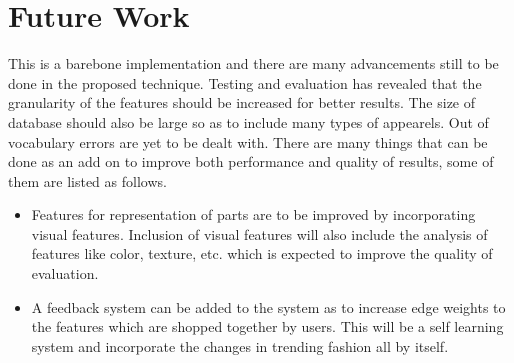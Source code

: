 \chapter{Future Work}

This is a barebone implementation and there are many advancements still to be done in the proposed technique. Testing and evaluation has revealed that the granularity of the features should be increased for better results. The size of database should also be large so as to include many types of appearels. Out of vocabulary errors are yet to be dealt with. There are many things that can be done as an add on to improve both performance and quality of results, some of them are listed as follows.

\begin{itemize}

\item Features for representation of parts are to be improved by incorporating visual features. Inclusion of visual features will also include the analysis of features like color, texture, etc. which is expected to improve the quality of evaluation.

\item A feedback system can be added to the system as to increase edge weights to the features which are shopped together by users. This will be a self learning system and incorporate the changes in trending fashion all by itself.

\end{itemize}